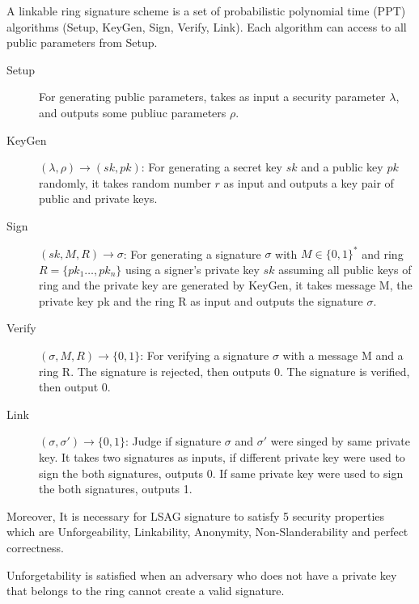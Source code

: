     \begin{definition}
    A linkable ring signature scheme is a set of probabilistic polynomial time (PPT) algorithms (Setup, KeyGen, Sign, Verify, Link). Each algorithm can access to all public parameters from Setup.
    \begin{description}
        \item[Setup] For generating public parameters, takes as input a security parameter $\lambda$, and outputs some publiuc parameters $\rho$.
        \item[KeyGen] $(\lambda,\rho) \rightarrow (sk,pk) $: For generating a secret key $sk$ and a public key $pk$ randomly, it takes random number $r$ as input and outputs a key pair of public and private keys.
        
        \item[Sign] $(sk,M,R) \rightarrow \sigma$: For generating a signature $\sigma $ with $M \in \{ 0,1 \}^*$ and ring $R= \{ pk_1 \ldots , pk_n \} $ using a signer's private key $sk$ assuming all public keys of ring and the private key are generated by KeyGen, it takes message M, the private key pk and the ring R as input and outputs the signature $\sigma $.
        
        \item[Verify] $(\sigma, M, R) \rightarrow \{ 0,1 \}$: For verifying a signature $\sigma$ with a message M and a ring R. The signature is rejected, then outputs 0. The signature is verified, then output 0.
        
        \item[Link] $(\sigma, \sigma ') \rightarrow \{ 0,1 \}$: Judge if signature $\sigma $ and $\sigma '$ were singed by same private key. It takes two signatures as inputs, if different private key were used to sign the both signatures, outputs 0. If same private key were used to sign the both signatures, outputs 1.
    \end{description}
    \end{definition}
    
    Moreover, It is necessary for LSAG signature to satisfy 5 security properties which are Unforgeability, Linkability, Anonymity, Non-Slanderability and perfect correctness.
    
    Unforgetability is satisfied when an adversary who does not have a private key that belongs to the ring cannot create a valid signature.
    
